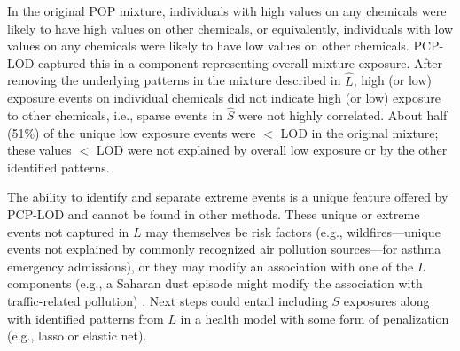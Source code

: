 In the original POP mixture, individuals with high values on any chemicals were likely to have high values on other chemicals, or equivalently, individuals with low values on any chemicals were likely to have low values on other chemicals. PCP-LOD captured this in a component representing overall mixture exposure. After removing the underlying patterns in the mixture described in $\hat{L}$, high (or low) exposure events on individual chemicals did not indicate high (or low) exposure to other chemicals, i.e., sparse events in $\hat{S}$ were not highly correlated. About half (51\%) of the unique low exposure events were $<$ LOD in the original mixture; these values $<$ LOD were not explained by overall low exposure or by the other identified patterns.

The ability to identify and separate extreme events is a unique feature offered by PCP-LOD and cannot be found in other methods. These unique or extreme events not captured in $L$ may themselves be risk factors (e.g., wildfires---unique events not explained by commonly recognized air pollution sources---for asthma emergency admissions)\citep{delfino08}, or they may modify an association with one of the $L$ components (e.g., a Saharan dust episode might modify the association with traffic-related pollution) \citep{karanasiou12}. Next steps could entail including $S$ exposures along with identified patterns from $L$ in a health model with some form of penalization (e.g., lasso or elastic net).

